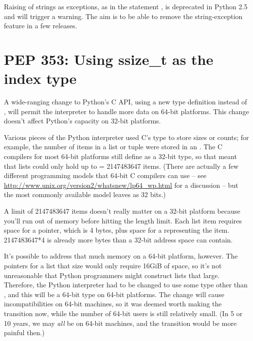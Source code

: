 \documentclass{howto}
\begin{document}
Raising of strings as exceptions, as in the statement , is deprecated in Python 2.5 and will trigger a
warning.  The aim is to be able to remove the string-exception feature
in a few releases.


\begin{seealso}


\end{seealso}


\section{PEP 353: Using ssize_t as the index type\label{pep-353}}

A wide-ranging change to Python's C API, using a new 
 type definition instead of , 
will permit the interpreter to handle more data on 64-bit platforms.
This change doesn't affect Python's capacity on 32-bit platforms.

Various pieces of the Python interpreter used C's  type to
store sizes or counts; for example, the number of items in a list or
tuple were stored in an .  The C compilers for most 64-bit
platforms still define  as a 32-bit type, so that meant
that lists could only hold up to  = 2147483647 items.
(There are actually a few different programming models that 64-bit C
compilers can use -- see
\url{http://www.unix.org/version2/whatsnew/lp64_wp.html} for a
discussion -- but the most commonly available model leaves 
as 32 bits.)

A limit of 2147483647 items doesn't really matter on a 32-bit platform
because you'll run out of memory before hitting the length limit.
Each list item requires space for a pointer, which is 4 bytes, plus
space for a  representing the item.  2147483647*4 is
already more bytes than a 32-bit address space can contain.

It's possible to address that much memory on a 64-bit platform,
however.  The pointers for a list that size would only require 16GiB
of space, so it's not unreasonable that Python programmers might
construct lists that large.  Therefore, the Python interpreter had to
be changed to use some type other than , and this will be a
64-bit type on 64-bit platforms.  The change will cause
incompatibilities on 64-bit machines, so it was deemed worth making
the transition now, while the number of 64-bit users is still
relatively small.  (In 5 or 10 years, we may \emph{all} be on 64-bit
machines, and the transition would be more painful then.)
\end{document}

